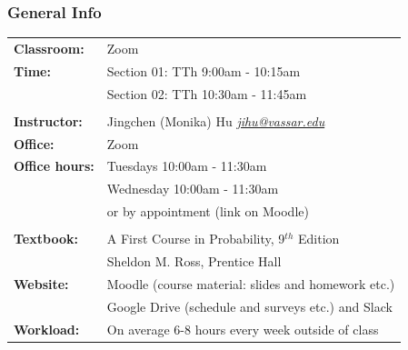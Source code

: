 \documentclass[slidestop,compress,mathserif]{beamer}
\begin{document}
\begin{frame}
\frametitle{General Info}

\begin{tabular}{ p{3cm} p{9cm} }
\textbf{Classroom:}		& Zoom \\
\textbf{Time:}			& Section 01: TTh 9:00am - 10:15am \\
					& Section 02: TTh 10:30am - 11:45am \\
					& \\
\textbf{Instructor:}		& Jingchen (Monika) Hu \href{mailto:jihu@vassar.edu}{\textit{jihu@vassar.edu}} \\
\textbf{Office:}			& Zoom\\
\textbf{Office hours:}		&  Tuesdays 10:00am - 11:30am \\
					& Wednesday 10:00am - 11:30am \\
					& or by appointment (link on Moodle) \\
					& \\
\textbf{Textbook:}		& A First Course in Probability, 9$^{th}$ Edition\\
					& Sheldon M. Ross, Prentice Hall\\					
\textbf{Website:}		& Moodle (course material: slides and homework etc.)\\
 &Google Drive (schedule and surveys etc.) and Slack\\%
\textbf{Workload:}		& On average 6-8 hours every week outside of class\\
					
\end{tabular}

\end{frame}







\end{document}
